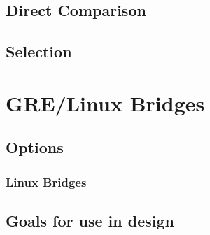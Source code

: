 \documentclass[10pt,letterpaper,onecolumn,draftclsnofoot]{IEEEtran}
\begin{document}
\subsubsection{}

\subsubsection{}

\subsubsection{}

\subsubsection{}

\subsection{Direct Comparison}

\subsection{Selection}


\section{GRE/Linux Bridges}

\subsection{Options}

\subsubsection{Linux Bridges}

\subsubsection{}

\subsubsection{}

\subsection{Goals for use in design}
\end{document}
